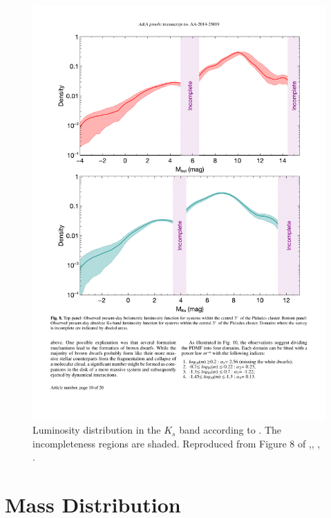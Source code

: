 \begin{figure}[ht!]
\begin{center}
\includegraphics[width=\textwidth]{background/Figures/F8_Bouy2015.pdf}
\caption{Luminosity distribution in the $K_s$ band according to \citet{Bouy2015}. The incompleteness regions are shaded. Reproduced from Figure 8 of \citet{Bouy2015},\textit{}, , .}
\label{fig:luminosityBouy}
\end{center}
\end{figure}

\section{Mass Distribution}

